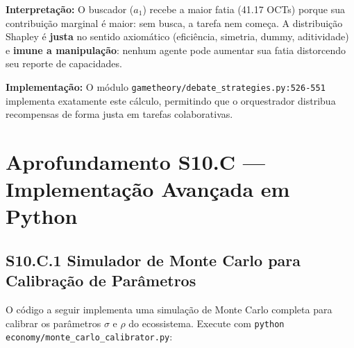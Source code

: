 \textbf{Interpretação:} O buscador ($a_1$) recebe a maior fatia (41.17 OCTs) porque sua contribuição marginal é maior: sem busca, a tarefa nem começa. A distribuição Shapley é \textbf{justa} no sentido axiomático (eficiência, simetria, dummy, aditividade) e \textbf{imune a manipulação}: nenhum agente pode aumentar sua fatia distorcendo seu reporte de capacidades.

\textbf{Implementação:} O módulo \texttt{gametheory/debate\_strategies.py:526-551} implementa exatamente este cálculo, permitindo que o orquestrador distribua recompensas de forma justa em tarefas colaborativas.


\section*{Aprofundamento S10.C --- Implementação Avançada em Python}

\subsection*{S10.C.1 Simulador de Monte Carlo para Calibração de Parâmetros}

O código a seguir implementa uma simulação de Monte Carlo completa para calibrar os parâmetros $\sigma$ e $\rho$ do ecossistema. Execute com \texttt{python economy/monte\_carlo\_calibrator.py}:

